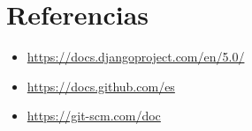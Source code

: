 \documentclass{article}
\begin{document}
	
  \newpage
  \section{Referencias}
  \begin{itemize}
    \item \url{https://docs.djangoproject.com/en/5.0/}
    \item \url{https://docs.github.com/es}
    \item \url{https://git-scm.com/doc}
  \end{itemize}

%
%
%
			
\end{document}
